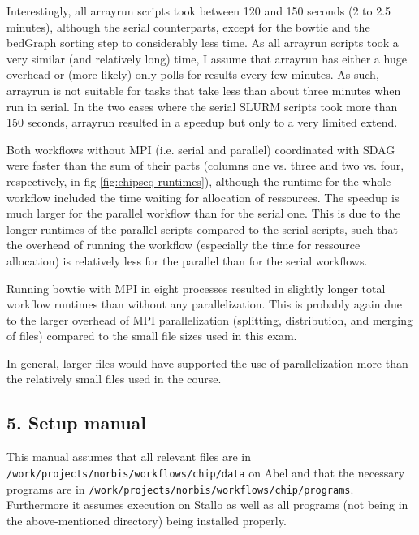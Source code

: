 \documentclass[paper=a4, 12pt]{scrartcl}
\begin{document}
Interestingly, all arrayrun scripts took between 120 and 150 seconds (2 to 2.5 minutes), although the serial counterparts, except for the bowtie and the bedGraph sorting step to considerably less time. As all arrayrun scripts took a very similar (and relatively long) time, I assume that arrayrun has either a huge overhead or (more likely) only polls for results every few minutes. As such, arrayrun is not suitable for tasks that take less than about three minutes when run in serial. In the two cases where the serial SLURM scripts took more than 150 seconds, arrayrun resulted in a speedup but only to a very limited extend.

Both workflows without MPI (i.e. serial and parallel) coordinated with SDAG were faster than the sum of their parts (columns one vs. three and two vs. four, respectively, in fig \ref{fig:chipseq-runtimes}), although the runtime for the whole workflow included the time waiting for allocation of ressources. The speedup is much larger for the parallel workflow than for the serial one. This is due to the longer runtimes of the parallel scripts compared to the serial scripts, such that the overhead of running the workflow (especially the time for ressource allocation) is relatively less for the parallel than for the serial workflows.

Running bowtie with MPI in eight processes resulted in slightly longer total workflow runtimes than without any parallelization. This is probably again due to the larger overhead of MPI parallelization (splitting, distribution, and merging of files) compared to the small file sizes used in this exam.

In general, larger files would have supported the use of parallelization more than the relatively small files used in the course.

\subsection{5. Setup manual}

This manual assumes that all relevant files are in \texttt{/work/projects/norbis/workflows/chip/data} on Abel and that the necessary programs are in \texttt{/work/projects/norbis/workflows/chip/programs}. Furthermore it assumes execution on Stallo as well as all programs (not being in the above-mentioned directory) being installed properly.
\end{document}
